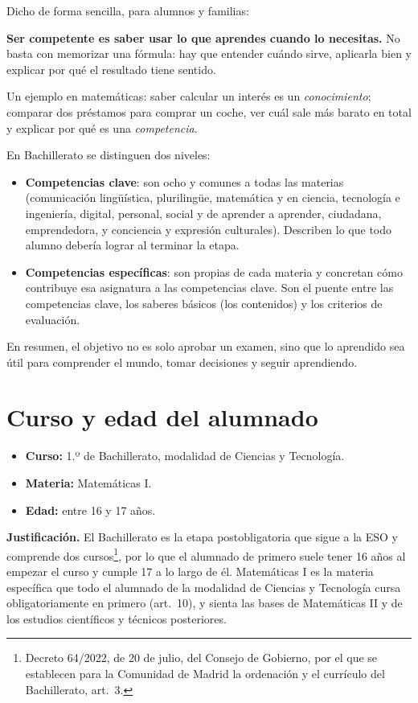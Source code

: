 \documentclass[11pt,a4paper]{article}
\begin{document}
Dicho de forma sencilla, para alumnos y familias:

\begin{tcolorbox}[enhanced, colback=gris!6, colframe=gris!60, boxrule=0.6pt,
    arc=2pt, left=8pt, right=8pt]
  \textbf{Ser competente es saber usar lo que aprendes cuando lo necesitas.}
  No basta con memorizar una fórmula: hay que entender cuándo sirve,
  aplicarla bien y explicar por qué el resultado tiene sentido.
\end{tcolorbox}

Un ejemplo en matemáticas: saber calcular un interés es un
\emph{conocimiento}; comparar dos préstamos para comprar un coche, ver cuál
sale más barato en total y explicar por qué es una \emph{competencia}.

En Bachillerato se distinguen dos niveles:
\begin{itemize}
  \item \textbf{Competencias clave}: son ocho y comunes a todas las materias
    (comunicación lingüística, plurilingüe, matemática y en ciencia,
    tecnología e ingeniería, digital, personal, social y de aprender a
    aprender, ciudadana, emprendedora, y conciencia y expresión culturales).
    Describen lo que todo alumno debería lograr al terminar la etapa.
  \item \textbf{Competencias específicas}: son propias de cada materia y
    concretan cómo contribuye esa asignatura a las competencias clave. Son el
    puente entre las competencias clave, los saberes básicos (los contenidos)
    y los criterios de evaluación.
\end{itemize}

En resumen, el objetivo no es solo aprobar un examen, sino que lo aprendido
sea útil para comprender el mundo, tomar decisiones y seguir aprendiendo.

\section{Curso y edad del alumnado}
\begin{itemize}
  \item \textbf{Curso:} 1.º de Bachillerato, modalidad de Ciencias y
    Tecnología.
  \item \textbf{Materia:} Matemáticas I.
  \item \textbf{Edad:} entre 16 y 17 años.
\end{itemize}

\textbf{Justificación.} El Bachillerato es la etapa postobligatoria que sigue
a la ESO y comprende dos cursos\footnote{Decreto 64/2022, de 20 de julio, del
Consejo de Gobierno, por el que se establecen para la Comunidad de Madrid la
ordenación y el currículo del Bachillerato, art.~3.}, por lo que el
alumnado de primero suele tener 16 años al empezar el curso y cumple 17 a lo
largo de él. Matemáticas I es la materia específica que todo el alumnado de
la modalidad de Ciencias y Tecnología cursa obligatoriamente en primero
(art.~10), y sienta las bases de Matemáticas II y de los estudios
científicos y técnicos posteriores.
\end{document}
